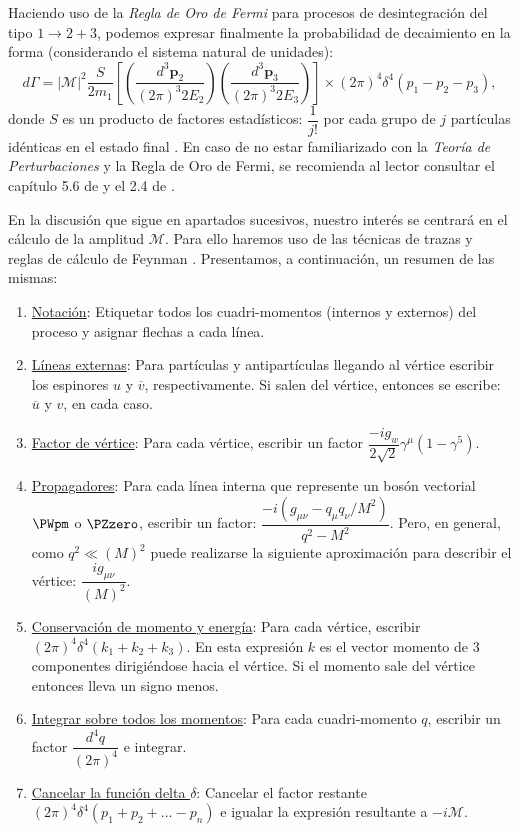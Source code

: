 Haciendo uso de la \textit{Regla de Oro de Fermi} para procesos de desintegración del tipo $1 \rightarrow 2+3$, podemos expresar finalmente la probabilidad de decaimiento en la forma (considerando el sistema natural de unidades):
\begin{equation}
d\Gamma =\left| \mathcal{M}\right| ^{2}\dfrac{S}{2m_{1}}\left[ \left( \dfrac{d^{3}\boldsymbol{p}_{2}}{\left( 2\pi \right) ^{3}2E_{2}}\right) \left( \dfrac{d^{3}\boldsymbol{p}_{3}}{\left( 2\pi \right) ^{3}2E_{3}}\right) \right] \times \left( 2\pi \right) ^{4}\delta ^{4}\left( p_{1}-p_{2}-p_{3}\right),\label{eq:defROF}
\end{equation}
donde $S$ es un producto de factores estadísticos: $\dfrac{1}{j!}$ por cada grupo de $j$ partículas idénticas en el estado final \cite{Griffiths2008}. En caso de no estar familiarizado con la \textit{Teoría de Perturbaciones} y la Regla de Oro de Fermi, se recomienda al lector consultar el capítulo 5.6 de \cite{SakuraiQM} y el 2.4 de \cite{SakuraiMCR}.

En la discusión que sigue en apartados sucesivos, nuestro interés se centrará en el cálculo de la amplitud $\mathcal{M}$. Para ello haremos uso de las técnicas de trazas y reglas de cálculo de Feynman \cite{Griffiths2008}. Presentamos, a continuación, un resumen de las mismas:

\begin{enumerate}
\item \underline{Notación}: Etiquetar todos los cuadri-momentos (internos y externos) del proceso y asignar flechas a cada línea.
\item \underline{Líneas externas}: Para partículas y antipartículas llegando al vértice escribir los espinores $u$ y $\overline{v}$, respectivamente. Si salen del vértice, entonces se escribe: $\overline{u}$ y $v$, en cada caso.
\item \underline{Factor de vértice}: Para cada vértice, escribir un factor $\dfrac{-ig_{w}}{2\sqrt{2}}\gamma ^{\mu }\left( 1-\gamma ^{5}\right)$. 
\item \underline{Propagadores}: Para cada línea interna que represente un bosón vectorial $\PWpm$ o $\PZzero$, escribir un factor: 
$\dfrac{-i\left( g_{\mu\nu }-q_{\mu }q_{\nu }/M^{2}\right) }{q^{2}-M^{2}}$. Pero, en general, como $q^{2}\ll \left( M\right)^{2}$ puede realizarse la siguiente aproximación para describir el vértice: $\dfrac{ig_{\mu \nu }}{\left( M\right) ^{2}}$.
\item \underline{Conservación de momento y energía}: Para cada vértice, escribir $\left( 2\pi \right) ^{4}\delta ^{4}\left( k_{1}+k_{2}+k_{3}\right)$. En esta expresión $k$ es el vector momento de 3 componentes dirigiéndose hacia el vértice. Si el momento sale del vértice entonces lleva un signo menos.
\item \underline{Integrar sobre todos los momentos}: Para cada cuadri-momento $q$, escribir un factor $\dfrac{d^{4}q}{\left( 2\pi \right) ^{4}}$ e integrar.
\item \underline{Cancelar la función delta $\delta$}: Cancelar el factor restante $\left( 2\pi \right) ^{4}\delta ^{4}\left( p_{1}+p_{2}+\ldots -p_{n}\right)$ e igualar la expresión resultante a $-i\mathcal{M}$.
\end{enumerate}


